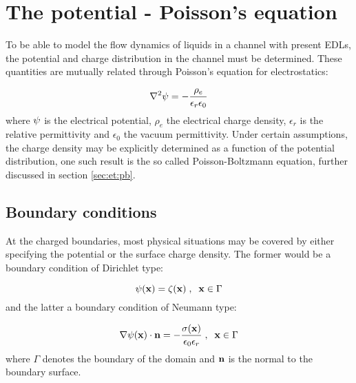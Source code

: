 \section{The potential - Poisson's equation}\label{sec:et:poisson}
To be able to model the flow dynamics of liquids in a channel with
present EDLs, the potential and charge distribution
in the channel must be determined. These quantities are mutually
related through Poisson's equation for electrostatics:

\begin{equation}\label{eq:pb}
\nabla^2\mathrm{\psi} = -\frac{\rho_e}{\epsilon_r \epsilon_0}
\end{equation}
where $\mathrm{\psi}$ is the electrical potential, $\rho_e$ the electrical
charge density, $\epsilon_r$ is the relative permittivity and
$\epsilon_0$ the vacuum permittivity. Under certain assumptions, the
charge density may be explicitly determined as a function of the
potential distribution, one such result is the so called
Poisson-Boltzmann equation, further discussed in section \ref{sec:et:pb}.

\subsection{Boundary conditions}
At the charged boundaries, most physical situations may be covered by
either specifying the potential or the surface charge density. The
former would be a boundary condition of Dirichlet type:

\begin{equation}
\mathrm{\psi}(\mathbf{x}) = \zeta(\mathbf{x})\;,\;\; \mathbf{x} \in \Gamma
\end{equation}
and the latter a boundary condition of Neumann type:

\begin{equation}\label{eq:et:fix_c}
\nabla\mathrm{\psi}(\mathbf{x}) \cdot \mathbf{n} =
-\frac{\sigma(\mathbf{x})}{\epsilon_0\epsilon_r}\;,\;\; \mathbf{x} \in \Gamma
\end{equation}
where $\Gamma$ denotes the boundary of the domain and $\mathbf{n}$ is the
normal to the boundary surface.\- \cite{hlushkou}
